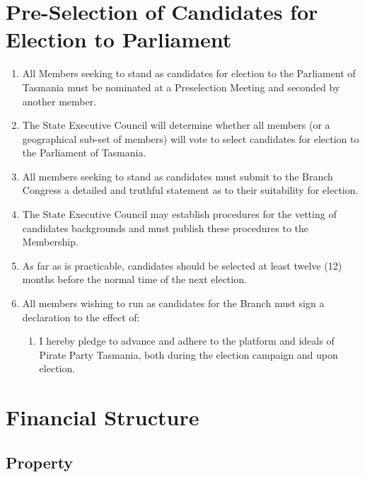 \documentclass[a4paper,titlepage,8.5pt]{article}
\newcommand{\state}{Tasmania}
\newcommand{\stateorterritory}{State}
\newcommand{\legislature}{Parliament}
\begin{document}
\section{Pre-Selection of Candidates for Election to {\legislature}}

\begin{enumerate}
\item All Members seeking to stand as candidates for election to the {\legislature} of {\state} must be nominated at a Preselection Meeting and seconded by another member.
\item The {\stateorterritory} Executive Council will determine whether all members (or a geographical sub-set of members) will vote to select candidates for election to the {\legislature} of {\state}.
\item All members seeking to stand as candidates must submit to the Branch Congress a detailed and truthful statement as to their suitability for election.
\item The {\stateorterritory} Executive Council may establish procedures for the vetting of candidates backgrounds and must publish these procedures to the Membership.
\item As far as is practicable, candidates should be selected at least twelve (12) months before the normal time of the next election.
\item All members wishing to run as candidates for the Branch must sign a declaration to the effect of:
\begin{enumerate}
	\item I hereby pledge to advance and adhere to the platform and ideals of Pirate Party {\state}, both during the election campaign and upon election.
\end{enumerate}
\end{enumerate}

\section{Financial Structure}

\subsection{Property}
\end{document}
